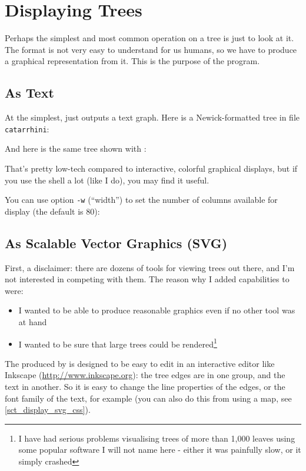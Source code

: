 
\section{Displaying Trees}
\label{sct_display}

Perhaps the simplest and most common operation on a \nw{} tree is just to look
at it. The \nw{} format is not very easy to understand for us humans, so we
have to produce a graphical representation from it. This is the purpose of the
\display{} program. 

\subsection{As Text}
\label{sct_display_text}

At the simplest, \display{} just outputs a text graph. Here is a
Newick-formatted tree in file \texttt{catarrhini}:

And here is the same tree shown with \display{}:

\begin{samepage}

\end{samepage}
That's pretty low-tech compared to interactive, colorful graphical displays,
but if you use the shell a lot (like I do), you may find it useful.

You can use option \texttt{-w} (``width'') to set the number of columns
available for display (the default is 80):


\begin{samepage}

\end{samepage}

\subsection{As Scalable Vector Graphics (SVG)}
\label{sct_display_svg}

First, a disclaimer: there are dozens of tools for viewing trees out there, and
I'm not interested in competing with them. The reason why I added \svg{}
capabilities to \display{} were: \begin{itemize} \item I wanted to be able to
produce reasonable graphics even if no other tool was at hand \item I wanted to
be sure that large trees could be rendered\footnote{I have had serious problems
visualising trees of more than 1,000 leaves using some popular software I will
not name here - either it was painfully slow, or it simply crashed}
\end{itemize} The \svg{} produced by \display{} is designed to be easy to edit
in an interactive editor like Inkscape (\url{http://www.inkscape.org}): the
tree edges are in one group, and the text in another. So it is easy to change
the line properties of the edges, or the font family of the text, for example
(you can also do this from \display{} using a \css{} map, see
\ref{sct_display_svg_css}).

